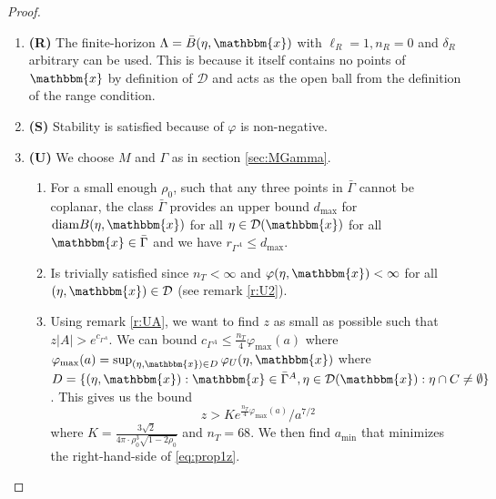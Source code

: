 \documentclass[12pt,a4paper]{article}
\theoremstyle{definition}
\theoremstyle{remark}
\theoremstyle{theorem}
\newcommand{\x}{\mathbbm{x}}
\begin{document}
\begin{proof}
\begin{enumerate}[]
	\item \textbf{(R)} The finite-horizon $\Lambda = \bar B(\eta,\x)$ with $\ell_R = 1, n_R = 0$ and $\delta_R$ arbitrary can be used. This is because it itself contains no points of $\x$ by definition of $\mathcal D$ and acts as the open ball from the definition of the range condition.
	\item \textbf{(S)} Stability is satisfied because of $\varphi$ is non-negative.
	\item \textbf{(U)} We choose $M$ and $\Gamma$ as in section \ref{sec:MGamma}.
		\begin{enumerate}[(U1)]
			\item For a small enough $\rho_0$, such that any three points in $\bar \Gamma$ cannot be coplanar, the class $\bar\Gamma$ provides an upper bound $d_{\text{max}}$ for $\text{diam} B(\eta,\x)$ for all $\eta \in \mathcal D(\x)$ for all $\x \in \bar \Gamma$ and we have $r_{\Gamma^A} \leq d_{\text{max}} $.  
			\item Is trivially satisfied since $n_T < \infty$ and $\varphi(\eta,\x)<\infty$ for all $(\eta,\x)\in\mathcal D$ (see remark \ref{r:U2}).
			\item Using remark \ref{r:UA}, we want to find $z$ as small as possible such that $z|A| > e^{c_{\Gamma^A}}$. We can bound $c_{\Gamma^A} \leq \frac {n_T}4 \varphi_{\text{max}}(a) $ where $\varphi_{\text{max}}(a) = \sup_{(\eta,\x) \in D} \varphi_U(\eta,\x)$ where $D=\{ (\eta,\x): \x \in \bar\Gamma^A, \eta \in \mathcal D(\x): \eta\cap C \neq \emptyset\}$.  This gives us the bound
				\begin{equation}z > K e^{\frac{n_T}{4} \varphi_{\text{max}}(a)}/a^{7/2}\label{eq:prop1z}\end{equation}
				where $K = \frac{3\sqrt{2}}{4\pi \cdot \rho_0^3 \sqrt{1-2\rho_0}}$ and $n_T = 68$. We then find $a_\text{min}$ that minimizes the right-hand-side of \ref{eq:prop1z}.
		\end{enumerate}
\end{enumerate}
\end{proof}
\end{document}
